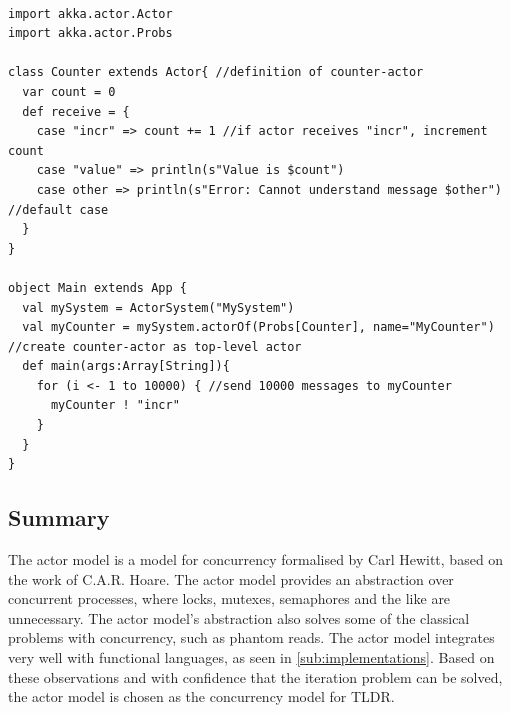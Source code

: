 \begin{lstlisting}[style = scala, caption={A simple message-counter in Scala.}, label=lst:AkkExample]

import akka.actor.Actor
import akka.actor.Probs

class Counter extends Actor{ //definition of counter-actor
  var count = 0
  def receive = {
    case "incr" => count += 1 //if actor receives "incr", increment count
    case "value" => println(s"Value is $count")
    case other => println(s"Error: Cannot understand message $other") //default case
  }
}

object Main extends App {
  val mySystem = ActorSystem("MySystem")
  val myCounter = mySystem.actorOf(Probs[Counter], name="MyCounter") //create counter-actor as top-level actor
  def main(args:Array[String]){
    for (i <- 1 to 10000) { //send 10000 messages to myCounter
      myCounter ! "incr"
    }
  }
}
\end{lstlisting}



\subsection{Summary}
The actor model is a model for concurrency formalised by Carl Hewitt, based on the work of C.A.R. Hoare. The actor model provides an abstraction over concurrent processes, where locks, mutexes, semaphores and the like are unnecessary. The actor model's abstraction also solves some of the classical problems with concurrency, such as phantom reads. The actor model integrates very well with functional languages, as seen in \cref{sub:implementations}. Based on these observations and with confidence that the iteration problem can be solved, the actor model is chosen as the concurrency model for TLDR.
